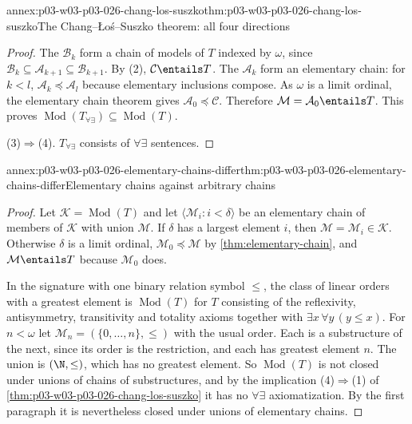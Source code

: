\begin{annexitem}{annex:p03-w03-p03-026-chang-los-suszko}{thm:p03-w03-p03-026-chang-los-suszko}{The Chang--\L o\'s--Suszko theorem: all four directions}
\begin{proof}
The \(\mathcal B_k\) form a chain of models of \(T\) indexed by \(\omega\),
since \(\mathcal B_k\subseteq\mathcal A_{k+1}\subseteq\mathcal B_{k+1}\).
By (2), \(\mathcal C\entails T\).  The \(\mathcal A_k\) form an elementary
chain: for \(k<l\), \(\mathcal A_k\preccurlyeq\mathcal A_l\) because
elementary inclusions compose.  As \(\omega\) is a limit ordinal, the
elementary chain theorem gives \(\mathcal A_0\preccurlyeq\mathcal C\).
Therefore \(\mathcal M=\mathcal A_0\entails T\).  This proves
\(\operatorname{Mod}(T_{\forall\exists})\subseteq\operatorname{Mod}(T)\).

(3)\(\Rightarrow\)(4).  \(T_{\forall\exists}\) consists of
\(\forall\exists\) sentences.
\end{proof}
\end{annexitem}

\begin{annexitem}{annex:p03-w03-p03-026-elementary-chains-differ}{thm:p03-w03-p03-026-elementary-chains-differ}{Elementary chains against arbitrary chains}
\begin{proof}
Let \(\mathcal K=\operatorname{Mod}(T)\) and let
\(\langle\mathcal M_i:i<\delta\rangle\) be an elementary chain of members
of \(\mathcal K\) with union \(\mathcal M\).  If \(\delta\) has a largest
element \(i\), then \(\mathcal M=\mathcal M_i\in\mathcal K\).  Otherwise
\(\delta\) is a limit ordinal, \(\mathcal M_0\preccurlyeq\mathcal M\) by
\cref{thm:elementary-chain}, and \(\mathcal M\entails T\) because
\(\mathcal M_0\) does.

In the signature with one binary relation symbol \(\le\), the class of
linear orders with a greatest element is \(\operatorname{Mod}(T)\) for
\(T\) consisting of the reflexivity, antisymmetry, transitivity and
totality axioms together with
\(\exists x\,\forall y\,(y\le x)\).  For \(n<\omega\) let
\(\mathcal M_n=(\{0,\ldots,n\},\le)\) with the usual order.  Each is a
substructure of the next, since its order is the restriction, and each has
greatest element \(n\).  The union is \((\N,\le)\), which has no greatest
element.  So \(\operatorname{Mod}(T)\) is not closed under unions of chains
of substructures, and by the implication (4)\(\Rightarrow\)(1) of
\cref{thm:p03-w03-p03-026-chang-los-suszko} it has no \(\forall\exists\)
axiomatization.  By the first paragraph it is nevertheless closed under
unions of elementary chains.
\end{proof}
\end{annexitem}

